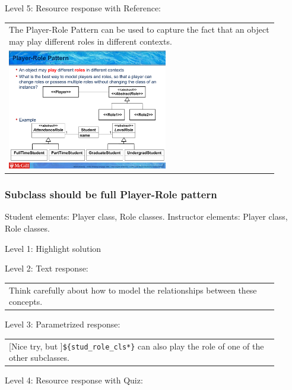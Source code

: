 \noindent Level 5: Resource response with Reference: \medskip

\begin{tabular}{|p{0.9\linewidth}}
The Player-Role Pattern can be used to capture the fact that an object may play different roles
in different contexts.

\\
\includegraphics[width=0.6\textwidth]{images/player_role.png}
\end{tabular} \medskip


\subsubsection{Subclass should be full Player-Role pattern}

Student elements: Player class, Role classes. Instructor elements: Player class, Role classes. \medskip

\noindent Level 1: Highlight solution  \medskip

\noindent Level 2: Text response: \medskip

\begin{tabular}{|p{0.9\linewidth}}
Think carefully about how to model the relationships between these concepts.
\end{tabular} \medskip

\noindent Level 3: Parametrized response: \medskip

\begin{tabular}{|p{0.9\linewidth}}
[Nice try, but ]\verb|${stud_role_cls*}| can also play the role of one of the other subclasses.
\end{tabular} \medskip

\noindent Level 4: Resource response with Quiz: \medskip


